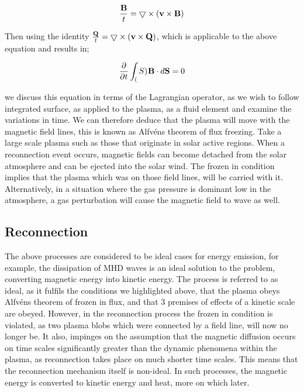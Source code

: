 \begin{equation}
	\frac{\mathbf{B}}{t} = \bigtriangledown \times (\mathbf{v} \times \mathbf{B})
\end{equation}

\noindent Then using the identity $\frac{\mathbf{Q}}{t} = \bigtriangledown \times (\mathbf{v} \times \mathbf{Q})$, which is applicable to the above equation and results in;

\begin{equation}
	\frac{\partial }{\partial t } \int_(S)^{} \mathbf{B} \cdot d\mathbf{S} = 0
\end{equation}

\noindent we discuss this equation in terms of the Lagrangian operator, as we wish to follow integrated surface, as applied to the plasma, as a fluid element and examine the variations in time.
We can therefore deduce that the plasma will move with the magnetic field lines, this is known as Alfv{\'e}ns theorem of flux freezing.
Take a large scale plasma such as those that originate in solar active regions. 
When a reconnection event occurs, magnetic fields can become detached from the solar atmosphere and can be ejected into the solar wind.
The frozen in condition implies that the plasma which was on those field lines, will be carried with it.
Alternatively, in a situation where the gas pressure is dominant low in the atmosphere, a gas perturbation will cause the magnetic field to wave as well.
 


\subsection{Reconnection}
\label{sec:recon}

The above processes are considered to be ideal cases for energy emission, for example, the dissipation of MHD waves is an ideal solution to the problem, converting magnetic energy into kinetic energy.
The process is referred to as ideal, as it fulfils the conditions we highlighted above, that the plasma obeys Alfv{\'e}ns theorem of frozen in flux, and that 3 premises of effects of a kinetic scale are obeyed.
However, in the reconnection process the frozen in condition is violated, as two plasma blobs which were connected by a field line, will now no longer be.
It also, impinges on the assumption that the magnetic diffusion occurs on time scales significantly greater than the dynamic phenomena within the plasma, as reconnection takes place on much shorter time scales.
This means that the reconnection mechanism itself is non-ideal.
In such processes, the magnetic energy is converted to kinetic energy and heat, more on which later.

